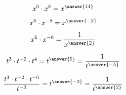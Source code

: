 \documentclass{ximera}
\author{Lee Wayand}
\begin{document}
\begin{example}








\begin{question}


\[
x^6 \cdot x^8 = x^{\answer{14}}
\]

\end{question}






\begin{question}


\[
x^6 \cdot x^{-8} = x^{\answer{-2}}
\]

\end{question}








\begin{question}


\[
x^6 \cdot x^{-8} = \frac{1}{x^{\answer{2}}}
\]

\end{question}









\begin{question}


\[
t^3 \cdot t^{-2} \cdot t^{4} =  t^{\answer{5}}   =  \frac{1}{t^{\answer{-5}}}
\]

\end{question}









\begin{question}


\[
\frac{t^3 \cdot t^{-2} \cdot t^{-6}}{t^{-3}} =  t^{\answer{-2}}   =  \frac{1}{t^{\answer{2}}}
\]

\end{question}






\end{example}
\end{document}

